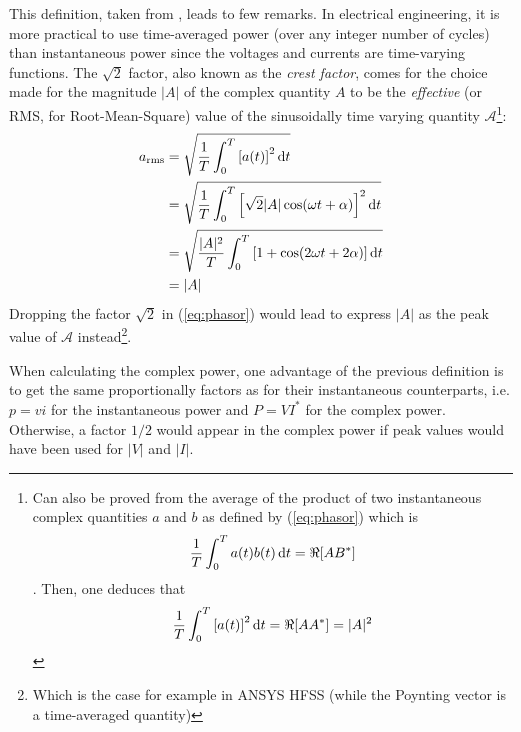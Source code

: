 This definition, taken from \parencite{Harrington2001}, leads to few remarks. In electrical engineering, it is more practical to use time-averaged power (over any integer number of cycles) than instantaneous power since the voltages and currents are time-varying functions. The $\sqrt{2}$ factor, also known as the \emph{crest factor}, comes for the choice made for the magnitude $|A|$ of the complex quantity $A$ to be the \emph{effective} (or RMS, for Root-Mean-Square) value of the sinusoidally time varying quantity $\mathcal{A}$\footnote{Can also be proved from the average of the product of two instantaneous complex quantities $a$ and $b$ as defined by (\ref{eq:phasor}) which is  
	$$ 
	\frac{1}{T}  \int_0^T a(t) b(t)\mathop{}\!\mathrm{d} t = \Re[AB^*]
	$$. Then, one deduces that 
	$$
	\frac{1}{T}  \int_0^T \left[a(t)\right]^2 \mathop{}\!\mathrm{d} t = \Re[AA^*] = |A|^2
	$$}: 
\begin{subequations}
	\begin{align}
	a_{\mathrm{rms}}
	&= \sqrt{\frac{1}{T} \int_0^T \left[a(t) \right]^2 \mathop{}\!\mathrm{d} t}  \nonumber \\
	&= \sqrt{\frac{1}{T} \int_0^T  \left[\sqrt{2} |A| \cos (\omega t + \alpha) \right]^2 \mathop{}\!\mathrm{d} t} \nonumber \\
	&= \sqrt{\frac{|A|^2}{T} \int_0^T  \left[ 1+\cos (2\omega t + 2\alpha) \right] \mathop{}\!\mathrm{d} t} \nonumber \\
	&= |A| \nonumber
	\end{align}
\end{subequations}
Dropping the factor $\sqrt{2}$ in (\ref{eq:phasor}) would lead to express $|A|$ as the peak value of $\mathcal{A}$ instead\footnote{Which is the case for example in ANSYS HFSS (while the Poynting vector is a time-averaged quantity)}. 

When calculating the complex power, one advantage of the previous definition is to get the same proportionally factors as for their instantaneous counterparts, i.e. $p=v i$ for the instantaneous power and $P=VI^*$ for the complex power. Otherwise, a factor $1/2$ would appear in the complex power if peak values would have been used for $|V|$ and $|I|$.

